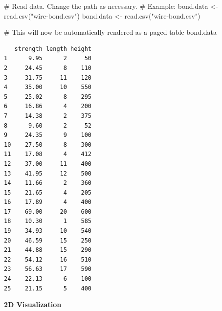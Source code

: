 \documentclass[
  letterpaper,
  DIV=11,
  numbers=noendperiod]{scrreprt}
\newenvironment{Shaded}{\begin{snugshade}}{\end{snugshade}}
\newcommand{\CommentTok}[1]{\textcolor[rgb]{0.37,0.37,0.37}{#1}}
\newcommand{\FunctionTok}[1]{\textcolor[rgb]{0.28,0.35,0.67}{#1}}
\newcommand{\NormalTok}[1]{\textcolor[rgb]{0.00,0.23,0.31}{#1}}
\newcommand{\OtherTok}[1]{\textcolor[rgb]{0.00,0.23,0.31}{#1}}
\newcommand{\StringTok}[1]{\textcolor[rgb]{0.13,0.47,0.30}{#1}}
\begin{document}
\begin{Shaded}
\begin{Highlighting}[]
\CommentTok{\# Read data. Change the path as necessary.}
\CommentTok{\# Example: bond.data \textless{}{-} read.csv("wire{-}bond.csv")}
\NormalTok{bond.data }\OtherTok{\textless{}{-}} \FunctionTok{read.csv}\NormalTok{(}\StringTok{"wire{-}bond.csv"}\NormalTok{)}

\CommentTok{\# This will now be automatically rendered as a paged table}
\NormalTok{bond.data}
\end{Highlighting}
\end{Shaded}

\begin{verbatim}
   strength length height
1      9.95      2     50
2     24.45      8    110
3     31.75     11    120
4     35.00     10    550
5     25.02      8    295
6     16.86      4    200
7     14.38      2    375
8      9.60      2     52
9     24.35      9    100
10    27.50      8    300
11    17.08      4    412
12    37.00     11    400
13    41.95     12    500
14    11.66      2    360
15    21.65      4    205
16    17.89      4    400
17    69.00     20    600
18    10.30      1    585
19    34.93     10    540
20    46.59     15    250
21    44.88     15    290
22    54.12     16    510
23    56.63     17    590
24    22.13      6    100
25    21.15      5    400
\end{verbatim}

\textbf{2D Visualization}
\end{document}
